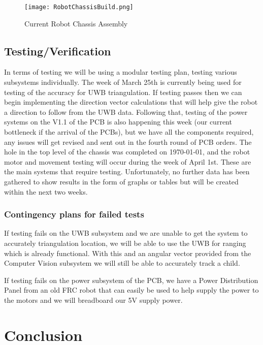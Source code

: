 \documentclass{report}
\begin{document}
    \begin{figure}[ht!]
        \centering
        \texttt{[image: RobotChassisBuild.png]}
        \caption{Current Robot Chassis Assembly}
        \label{fig:RobotChassisBuild}
    \end{figure}

    \section{Testing/Verification}
    \label{sec:Testing}
    In terms of testing we will be using a modular testing plan, testing various subsystems individually. The week of March 25th is currently being used for testing of the accuracy for UWB triangulation. If testing passes then we can begin implementing the direction vector calculations that will help give the robot a direction to follow from the UWB data. Following that, testing of the power systems on the V1.1 of the PCB is also happening this week (our current bottleneck if the arrival of the PCBs), but we have all the components required, any issues will get revised and sent out in the fourth round of PCB orders. The hole in the top level of the chassis was completed on \today, and the robot motor and movement testing will occur during the week of April 1st. These are the main systems that require testing. Unfortunately, no further data has been gathered to show results in the form of graphs or tables but will be created within the next two weeks.

    \subsection{Contingency plans for failed tests}
    If testing fails on the UWB subsystem and we are unable to get the system to accurately triangulation location, we will be able to use the UWB for ranging which is already functional. With this and an angular vector provided from the Computer Vision subsystem we will still be able to accurately track a child.

    If testing fails on the power subsystem of the PCB, we have a Power Distribution Panel from an old FRC robot that can easily be used to help supply the power to the motors and we will breadboard our 5V supply power.

    \chapter{Conclusion}
\end{document}
